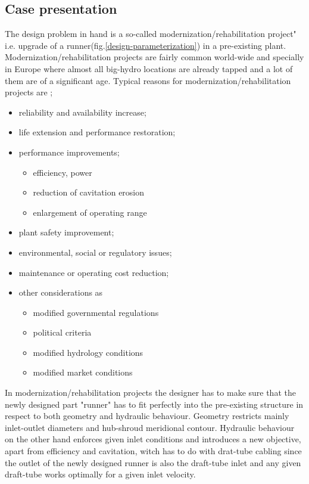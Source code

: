 \subsection{Case presentation}
The design problem in hand is a so-called modernization/rehabilitation project" i.e. upgrade of a runner(fig.\ref{design-parameterization}) in a pre-existing plant. Modernization/rehabilitation projects are fairly common world-wide and specially in Europe where almost all big-hydro locations are already tapped and a lot of them are of a significant age. Typical reasons for modernization/rehabilitation projects are ;
\begin{itemize}
\item reliability and availability increase; 
\item life extension and performance restoration; 
\item performance improvements;
\begin{itemize}
	\item efficiency, power
    \item reduction of cavitation erosion
	\item enlargement of operating range
\end{itemize}
\item plant safety improvement;
\item environmental, social or regulatory issues;
\item maintenance or operating cost reduction;
\item other considerations as
\begin{itemize}
	\item modified governmental regulations
	\item political criteria
	\item modified hydrology conditions
	\item modified market conditions
\end{itemize}
\end{itemize}

In modernization/rehabilitation projects  the designer has to make sure that the newly designed part "runner" has to fit perfectly into the pre-existing structure in respect to both geometry and hydraulic behaviour. Geometry restricts mainly inlet-outlet diameters and hub-shroud meridional contour. Hydraulic behaviour on the other hand enforces given inlet conditions and introduces a new objective, apart from efficiency and cavitation,  witch has to do with drat-tube cabling since the outlet of the newly designed runner is also the draft-tube inlet and any given draft-tube works optimally for a given inlet velocity.      
  
